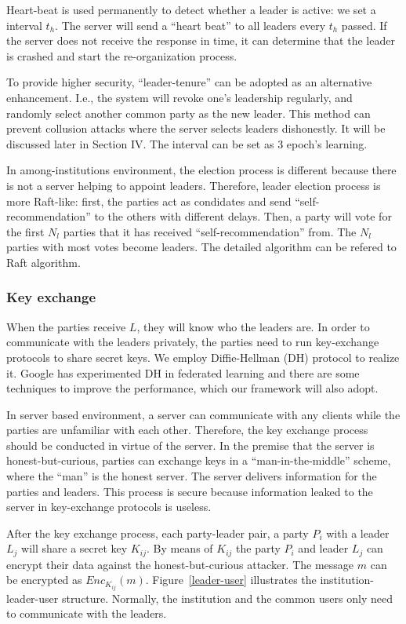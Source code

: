 Heart-beat is used permanently to detect whether a leader is active: we set a interval $t_h$. The server will send a ``heart beat'' to all leaders every $t_h$ passed. If the server does not receive the response in time, it can determine that the leader is crashed and start the re-organization process.

To provide higher security, ``leader-tenure'' can be adopted as an alternative enhancement. I.e., the system will revoke one's leadership regularly, and randomly select another common party as the new leader. This method can prevent collusion attacks where the server selects leaders dishonestly. It will be discussed later in Section IV. The interval can be set as 3 epoch's learning.

In among-institutions environment, the election process is different because there is not a server helping to appoint leaders. Therefore, leader election process is more Raft-like: first, the parties act as condidates and send ``self-recommendation'' to the others with different delays. Then, a party will vote for the first $N_l$ parties that it has received ``self-recommendation'' from. The $N_l$ parties with most votes become leaders. The detailed algorithm can be refered to Raft algorithm\cite{Raft}.


\subsubsection{\textbf{Key exchange}}
When the parties receive $L$, they will know who the leaders are. In order to communicate with the leaders privately, the parties need to run key-exchange protocols to share secret keys. We employ Diffie-Hellman (DH) protocol\cite{DH} to realize it. Google has experimented DH in federated learning\cite{Practical} and there are some techniques to improve the performance, which our framework will also adopt.

In server based environment, a server can communicate with any clients while the parties are unfamiliar with each other. Therefore, the key exchange process should be conducted in virtue of the server. In the premise that the server is honest-but-curious, parties can exchange keys in a ``man-in-the-middle'' scheme, where the ``man'' is the honest server. The server delivers information for the parties and leaders. This process is secure because information leaked to the server in key-exchange protocols is useless.

After the key exchange process, each party-leader pair, a party $P_i$ with a leader $L_j$ will share a secret key $K_{ij}$. By means of $K_{ij}$ the party $P_i$ and leader $L_j$ can encrypt their data against the honest-but-curious attacker. The message $m$ can be encrypted as $Enc_{K_{ij}}(m)$. Figure~\ref{leader-user} illustrates the institution-leader-user structure. Normally, the institution and the common users only need to communicate with the leaders.

